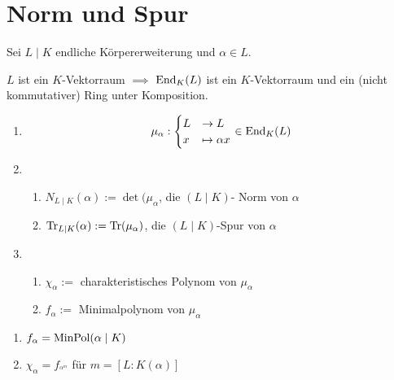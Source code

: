 \section{Norm und Spur}
Sei $L\mid K$ endliche Körpererweiterung und $\alpha \in L$.
\begin{remark}
	$L$ ist ein $K$-Vektorraum $\implies$ $\operatorname{End}_K (L)$ ist ein $K$-Vektorraum und ein (nicht kommutativer) Ring unter Komposition.
\end{remark}
\begin{definition}
	\begin{enumerate} %
		\item \begin{align*}
		\mu_{\alpha} : \begin{cases}
		L & \to L\\
		x &\mapsto \alpha x
		\end{cases} \in \operatorname{End}_K (L)
		\end{align*}
		\item \begin{enumerate}[label=]
			\item $N_{L \mid K}(\alpha) := \det(\mu_{\alpha}$, die $(L \mid K)$- Norm von $\alpha$
			\item $\operatorname{Tr}_{L \mid K}(\alpha) := \operatorname{Tr}(\mu_{\alpha})$, die $(L\mid K)$-Spur von $\alpha$
		\end{enumerate}
		\item \begin{enumerate}[label=]
			\item $\chi_{\alpha} :=$ charakteristisches Polynom von $\mu_{\alpha}$
			\item $f_{\alpha} :=$ Minimalpolynom von $\mu_{\alpha}$
		\end{enumerate}
	\end{enumerate}
\end{definition}
\begin{lemma}
	\begin{enumerate}
		\item $f_{\alpha} = \operatorname{MinPol}(\alpha \mid K)$
		\item $\chi_{\alpha} = f_^{\alpha}^m$ für $m = [L:K(\alpha)]$
	\end{enumerate}
\end{lemma}
